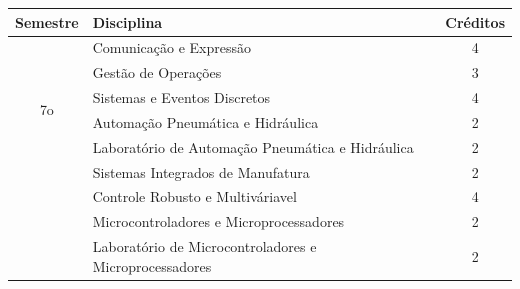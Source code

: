 \documentclass[12pt]{article} %
\begin{document}
\begin{table}[H]
\centering
\begin{tabular}{|c|l|c|}
\hline
Semestre             & Disciplina                                                 & Créditos \\ \hline                                        
\multirow{6}{*}{7o}  
				   & Comunicação e Expressão                          		& 4        \\ \cline{2-3} 
                     & Gestão de Operações                           & 3        \\ \cline{2-3} 
                     & Sistemas e Eventos Discretos                                 & 4        \\ \cline{2-3} 
                     & Automação Pneumática e Hidráulica                          & 2        \\ \cline{2-3} 
                     & Laboratório de Automação Pneumática e Hidráulica                          & 2        \\ \cline{2-3} 
                     & Sistemas Integrados de Manufatura                          & 2        \\ \cline{2-3}  
                     & Controle Robusto e Multiváriavel                                & 4        \\ \cline{2-3} 
                     & Microcontroladores e Microprocessadores                        & 2        \\ \cline{2-3} 
                     & Laboratório de Microcontroladores e Microprocessadores                            & 2        \\ \hline


\end{tabular}
\end{table}
\end{document}
